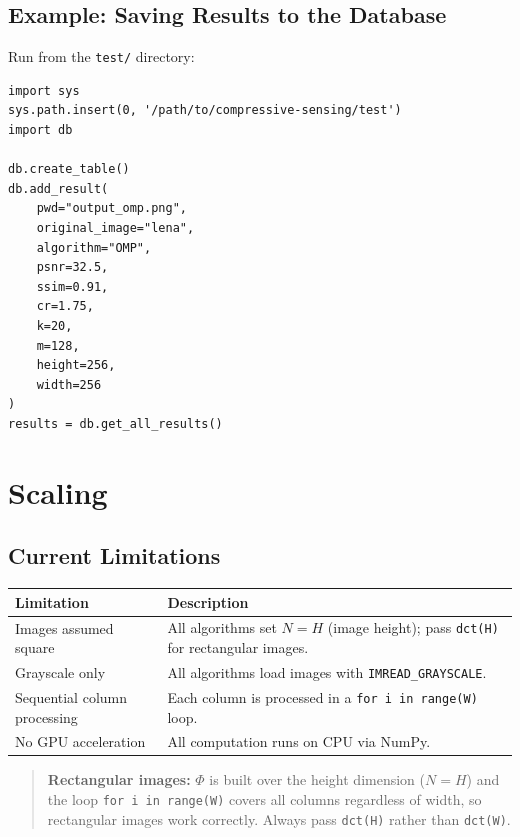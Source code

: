 \documentclass[12pt,a4paper]{article}
\newcommand{\cs}[1]{\texttt{#1}}          %
\begin{document}
\subsection{Example: Saving Results to the Database}

Run from the \cs{test/} directory:

\begin{lstlisting}[style=python]
import sys
sys.path.insert(0, '/path/to/compressive-sensing/test')
import db

db.create_table()
db.add_result(
    pwd="output_omp.png",
    original_image="lena",
    algorithm="OMP",
    psnr=32.5,
    ssim=0.91,
    cr=1.75,
    k=20,
    m=128,
    height=256,
    width=256
)
results = db.get_all_results()
\end{lstlisting}

\section{Scaling}

\subsection{Current Limitations}

\begin{center}
\begin{tabular}{p{5cm}p{9cm}}
  \toprule
  Limitation & Description \\
  \midrule
  Images assumed square
    & All algorithms set $N = H$ (image height); pass \cs{dct(H)} for
      rectangular images. \\[4pt]
  Grayscale only
    & All algorithms load images with \cs{IMREAD\_GRAYSCALE}. \\[4pt]
  Sequential column processing
    & Each column is processed in a \cs{for i in range(W)} loop. \\[4pt]
  No GPU acceleration
    & All computation runs on CPU via NumPy. \\
  \bottomrule
\end{tabular}
\end{center}

\begin{quote}
  \textbf{Rectangular images:} $\Phi$ is built over the height dimension
  ($N = H$) and the loop \verb|for i in range(W)| covers all columns
  regardless of width, so rectangular images work correctly.  Always pass
  \cs{dct(H)} rather than \cs{dct(W)}.
\end{quote}
\end{document}
